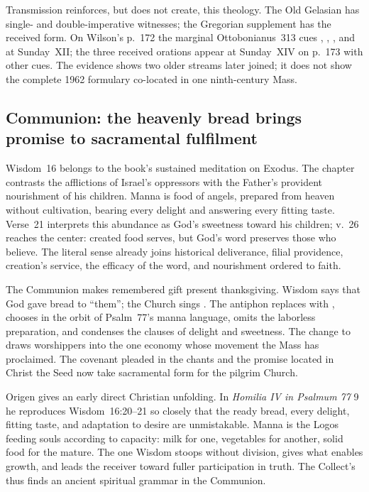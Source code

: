 Transmission reinforces, but does not create, this theology. The Old Gelasian
has single- and double-imperative witnesses; the Gregorian supplement has the
received form. On Wilson's p.~172 the marginal Ottobonianus~313 cues
, , , and  at Sunday~XII; the three received orations appear at Sunday~XIV on
p.~173 with other cues. The evidence shows two older streams later joined; it
does not show the complete 1962 formulary co-located in one ninth-century Mass.

\subsection*{Communion: the heavenly bread brings promise to sacramental fulfilment\enspace{}}

Wisdom~16 belongs to the book's sustained meditation on Exodus. The chapter
contrasts the afflictions of Israel's oppressors with the Father's provident
nourishment of his children. Manna is food of angels, prepared from heaven
without cultivation, bearing every delight and answering every fitting taste.
Verse~21 interprets this abundance as God's sweetness toward his children;
v.~26 reaches the center: created food serves, but God's word preserves those
who believe. The literal sense already joins historical deliverance, filial
providence, creation's service, the efficacy of the word, and nourishment
ordered to faith.

The Communion makes remembered gift present thanksgiving. Wisdom says that God
gave bread to ``them''; the Church sings . The antiphon replaces  with , chooses
 in the orbit of Psalm~77's manna language, omits the laborless
preparation, and condenses the clauses of delight and sweetness. The change to
 draws worshippers into the one economy whose movement the Mass
has proclaimed. The covenant pleaded in the chants and the promise located in
Christ the Seed now take sacramental form for the pilgrim Church.

Origen gives an early direct Christian unfolding. In \emph{Homilia IV in
Psalmum 77} 9 he reproduces Wisdom~16:20--21 so closely that the ready bread,
every delight, fitting taste, and adaptation to desire are unmistakable. Manna
is the Logos feeding souls according to capacity: milk for one, vegetables for
another, solid food for the mature. The one Wisdom stoops without division,
gives what enables growth, and leads the receiver toward fuller participation
in truth. The Collect's  thus finds an ancient spiritual
grammar in the Communion.

